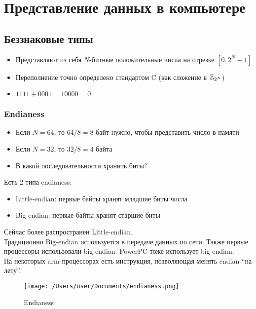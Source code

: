 \section{Представление данных в компьютере}
  \subsection{Беззнаковые типы}
  \begin{itemize}
    \item Представляют из себя $N$-битные положительные числа на отрезке $[0, 2^N - 1]$
    \item Переполнение точно определено стандартом C (как сложение в $\mathbb{Z}_{2^N}$)
    \item $1111+0001=10000=0$
  \end{itemize}
    
  \subsubsection{Endianess}
    \begin{itemize}
      \item Если $N = 64$, то $64 / 8 = 8$ байт нужно, чтобы представить число в памяти
      \item Если $N = 32$, то $32 / 8 = 4$ байта
      \item В какой последовательности хранить биты?
    \end{itemize}
    
    Есть 2 типа endianess:
    \begin{itemize}
      \item Little-endian: первые байты хранят младшие биты числа
      \item Big-endian: первые байты хранят старшие биты
    \end{itemize}
    Сейчас более распространен Little-endian.\\    Традиционно Big-endian используется в передаче данных по сети. Также первые процессоры использовали big-endian. PowerPC тоже использует big-endian.\\
    На некоторых arm-процессорах есть инструкция, позволяющая менять endian ``на лету''. 
    
\begin{figure}[H]
\centering
  \texttt{[image: /Users/user/Documents/endianess.png]}
  \caption{Endianess}
  \label{fig:endianess}
\end{figure}

    
